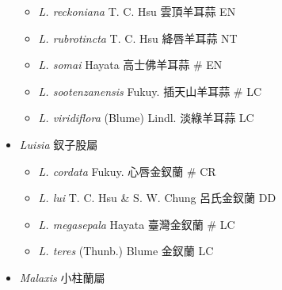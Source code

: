 \begin{itemize}
\begin{itemize}
        \item[] \textit{L. reckoniana} T. C. Hsu  雲頂羊耳蒜   EN
        \item[] \textit{L. rubrotincta} T. C. Hsu  絳唇羊耳蒜   NT
        \item[] \textit{L. somai} Hayata  高士佛羊耳蒜  \# EN
        \item[] \textit{L. sootenzanensis} Fukuy.  插天山羊耳蒜  \# LC
        \item[] \textit{L. viridiflora} (Blume) Lindl.  淡綠羊耳蒜   LC
  \end{itemize}
 \item[] \textit{Luisia} 釵子股屬
                                
  \begin{itemize}
        \item[] \textit{L. cordata} Fukuy.  心唇金釵蘭  \# CR
        \item[] \textit{L. lui} T. C. Hsu \& S. W. Chung  呂氏金釵蘭   DD
        \item[] \textit{L. megasepala} Hayata  臺灣金釵蘭  \# LC
        \item[] \textit{L. teres} (Thunb.) Blume  金釵蘭   LC
  \end{itemize}
 \item[] \textit{Malaxis} 小柱蘭屬
                                

\end{itemize}
